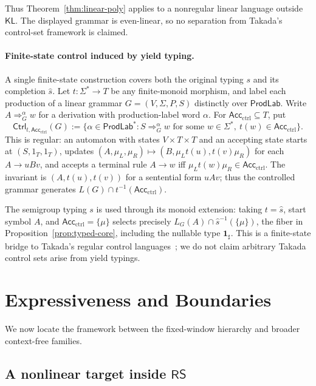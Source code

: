 \documentclass[11pt,a4paper]{article}
\theoremstyle{remark}
\theoremstyle{plain}
\begin{document}
Thus Theorem~\ref{thm:linear-poly} applies to a nonregular linear language
outside $\mathsf{KL}$. The displayed grammar is even-linear, so no
separation from Takada's control-set framework is claimed.

\paragraph{Finite-state control induced by yield typing.}
A single finite-state construction covers both the
original typing $s$ and its completion $\widehat s$.
Let $t:\Sigma^*\to T$ be any finite-monoid
morphism, and label each production of a linear
grammar $G=(V,\Sigma,P,S)$ distinctly over
$\mathsf{ProdLab}$.  Write $A\Rightarrow_G^\alpha w$
for a derivation with production-label word $\alpha$.
For $\mathsf{Acc}_{\mathrm{ctrl}}\subseteq T$, put
\[
\mathsf{Ctrl}_{t,\mathsf{Acc}_{\mathrm{ctrl}}}(G):=
\{\alpha\in\mathsf{ProdLab}^*:S\Rightarrow_G^\alpha w
\text{ for some }w\in\Sigma^*,\
t(w)\in\mathsf{Acc}_{\mathrm{ctrl}}\}.
\]
This is regular: an automaton with states
$V\times T\times T$ and an accepting state starts
at $(S,1_T,1_T)$, updates
$(A,\mu_L,\mu_R)\mapsto
(B,\mu_Lt(u),t(v)\mu_R)$ for each
$A\to uBv$, and accepts a terminal rule
$A\to w$ iff $\mu_Lt(w)\mu_R\in
\mathsf{Acc}_{\mathrm{ctrl}}$.
The invariant is $(A,t(u),t(v))$ for a
sentential form $uAv$; thus the controlled
grammar generates $L(G)\cap
t^{-1}(\mathsf{Acc}_{\mathrm{ctrl}})$.

The semigroup typing $s$ is used through its monoid extension:
taking $t=\widehat s$, start symbol $A$, and
$\mathsf{Acc}_{\mathrm{ctrl}}=\{\mu\}$
selects precisely
$L_G(A)\cap \widehat s^{-1}(\{\mu\})$,
the fiber in Proposition~\ref{prop:typed-core},
including the nullable type $\mathbf{1}_{\sharp}$.
This is a finite-state bridge to Takada's
regular control languages~\cite{takada1995};
we do not claim arbitrary Takada control sets
arise from yield typings.

\section{Expressiveness and Boundaries}
\label{sec:boundaries}

We now locate the framework between the fixed-window hierarchy and broader
context-free families.

\subsection{A nonlinear target inside \texorpdfstring{$\mathsf{RS}$}{RS}}
\end{document}
